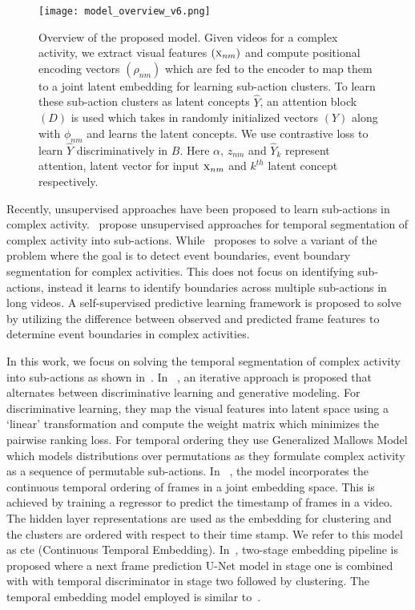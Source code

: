 \documentclass[final]{cvpr}
\begin{document}
\begin{figure*}[t]
  \texttt{[image: model\_overview\_v6.png]}
\caption{{\small Overview of the proposed model. Given videos for a complex activity, we extract visual features $(\textsc{x}_{nm})$ and compute positional encoding vectors $(\rho_{nm})$ which are fed to the encoder to map them to a joint latent embedding for learning sub-action clusters. To learn these sub-action clusters as latent concepts $\widehat{Y}$, an attention block $(D)$ is used which takes in randomly initialized vectors $(Y)$ along with $\phi_{nm}$ and learns the latent concepts. We use contrastive loss to learn $\widehat{Y}$ discriminatively in $B$. Here $\alpha$, $z_{nm}$ and $\widehat{Y}_{k}$ represent attention, latent vector for input $\textsc{x}_{nm}$ and $k^{th}$ latent concept respectively.
}}
\vspace{-0.4cm}
\label{fig:arch}
\end{figure*}

\par Recently, unsupervised approaches have been proposed to learn sub-actions in complex activity.~\cite{sener2018unsupervised, kukleva2019unsupervised, vidalmata2020joint} propose unsupervised approaches for temporal segmentation of complex activity into sub-actions. While~\cite{aakur2019perceptual} proposes to solve a variant of the problem where the goal is to detect event boundaries, \ie event boundary segmentation for complex activities. This does not focus on identifying sub-actions, instead it learns to identify boundaries across multiple sub-actions in long videos. 
A self-supervised predictive learning framework is proposed to solve by utilizing the difference between observed and predicted frame features to determine event boundaries in complex activities.

\par In this work, we focus on solving the temporal segmentation of complex activity into sub-actions as shown in~\cite{sener2018unsupervised, kukleva2019unsupervised, vidalmata2020joint}.
In ~\cite{sener2018unsupervised}, an iterative approach is proposed that alternates between discriminative learning and generative modeling. 
For discriminative learning, they map the visual features into latent space using a `linear' transformation and compute the weight matrix which minimizes the pairwise ranking loss. For temporal ordering they use Generalized Mallows Model which models distributions over permutations as they formulate complex activity as a sequence of permutable sub-actions. %
In ~\cite{kukleva2019unsupervised}, the model incorporates the continuous temporal ordering of frames in a joint embedding space. This is achieved by training a regressor to predict the timestamp of frames in a video. The hidden layer representations are used as the embedding for clustering and the clusters are ordered with respect to their time stamp. We refer to this model as {\sc cte} (Continuous Temporal Embedding). In~\cite{vidalmata2020joint}, two-stage embedding pipeline is proposed where a next frame prediction U-Net model in stage one is combined with  with temporal discriminator in stage two followed by clustering. The temporal embedding model employed is similar to~\cite{kukleva2019unsupervised}.
\end{document}
